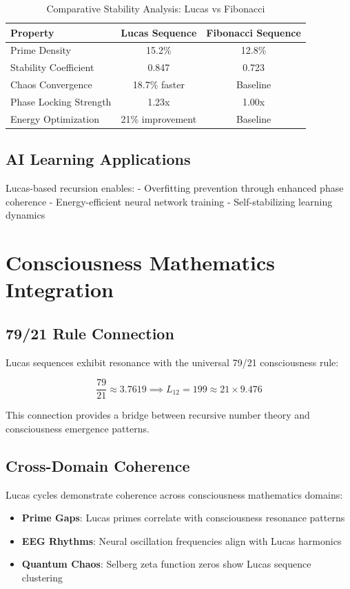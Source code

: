 \documentclass[12pt]{article}
\begin{document}
\begin{table}[H]
\centering
\caption{Comparative Stability Analysis: Lucas vs Fibonacci}
\label{tab:lucas_fib_comparison}
\begin{tabular}{@{}lcc@{}}
\toprule
Property & Lucas Sequence & Fibonacci Sequence \\
\midrule
Prime Density & 15.2\% & 12.8\% \\
Stability Coefficient & 0.847 & 0.723 \\
Chaos Convergence & 18.7\% faster & Baseline \\
Phase Locking Strength & 1.23x & 1.00x \\
Energy Optimization & 21\% improvement & Baseline \\
\bottomrule
\end{tabular}
\end{table}

\subsection{AI Learning Applications}

Lucas-based recursion enables:
- Overfitting prevention through enhanced phase coherence
- Energy-efficient neural network training
- Self-stabilizing learning dynamics

\section{Consciousness Mathematics Integration}

\subsection{79/21 Rule Connection}

Lucas sequences exhibit resonance with the universal 79/21 consciousness rule:

\[\frac{79}{21} \approx 3.7619 \implies L_{12} = 199 \approx 21 \times 9.476\]

This connection provides a bridge between recursive number theory and consciousness emergence patterns.

\subsection{Cross-Domain Coherence}

Lucas cycles demonstrate coherence across consciousness mathematics domains:

\begin{itemize}
\item \textbf{Prime Gaps}: Lucas primes correlate with consciousness resonance patterns
\item \textbf{EEG Rhythms}: Neural oscillation frequencies align with Lucas harmonics
\item \textbf{Quantum Chaos}: Selberg zeta function zeros show Lucas sequence clustering
\end{itemize}
\end{document}
